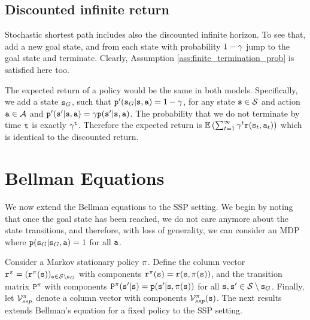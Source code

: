 \subsection{Discounted infinite return}

Stochastic shortest path includes also the discounted infinite
horizon. To see that, add a new goal state, and from each state with
probability $1-\gamma$ jump to the goal state and terminate. Clearly, Assumption \ref{ass:finite_termination_prob} is satisfied here too. 

The expected return of a policy would be the same in both models.
Specifically, we add a state ${\tt s}_G$, such that
${\tt p}'({\tt s}_G|{\tt s},{\tt a})=1-\gamma$, for any state
${\tt s}\in\mathcal{S}$ and action ${\tt a}\in\mathcal{A}$ and
${\tt p}'({\tt s}'|{\tt s},{\tt a})=\gamma {\tt p}({\tt s}'|{\tt s},{\tt a})$. The
probability that we do not terminate by time ${\tt t}$ is exactly
$\gamma^{\tt t}$. Therefore the expected return is
$\mathbb{E}\left(\sum_{t=1}^\infty \gamma^t{\tt r}({\tt s}_t,{\tt a}_t)\right)$ which is
identical to the discounted return.





\section{Bellman Equations}

We now extend the Bellman equations to the SSP setting. We begin by noting that once the goal state has been reached, we do not care anymore about the state transitions, and therefore, with loss of generality, we can consider an MDP where ${\tt p}({\tt s}_G|{\tt s}_G,{\tt a}) = 1$ for all ${\tt a}$. 

Consider a Markov stationary policy $\pi$. Define the column vector ${{\tt r}^\pi } =
{({{\tt r}^\pi }({\tt s}))_{{\tt s} \in \mathcal{S} \setminus {\tt s}_G}}$ with components
${{\tt r}^\pi }({\tt s}) = {\tt r}({\tt s},\pi ({\tt s}))$, and the
transition matrix ${{\tt P}^\pi }$ with components ${{\tt P}^\pi
}({\tt s}'|{\tt s}) = {\tt p}({\tt s}'|{\tt s},\pi ({\tt s}))$ for all ${\tt s},{\tt s}' \in \mathcal{S} \setminus {\tt s}_G$. Finally,
let ${\mathcal{V}_{ssp}^\pi }$ denote a column vector with components
${\mathcal{V}_{ssp}^\pi }({\tt s})$. The next results extends Bellman's equation for a fixed policy to the SSP setting.



